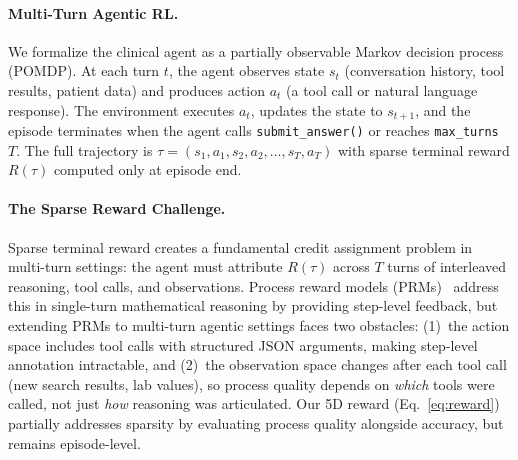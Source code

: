 \documentclass{article}
\begin{document}
\paragraph{Multi-Turn Agentic RL.}
We formalize the clinical agent as a partially observable Markov decision process (POMDP). At each turn $t$, the agent observes state $s_t$ (conversation history, tool results, patient data) and produces action $a_t$ (a tool call or natural language response). The environment executes $a_t$, updates the state to $s_{t+1}$, and the episode terminates when the agent calls \texttt{submit\_answer()} or reaches \texttt{max\_turns}~$T$. The full trajectory is $\tau = (s_1, a_1, s_2, a_2, \ldots, s_T, a_T)$ with sparse terminal reward $R(\tau)$ computed only at episode end.

\paragraph{The Sparse Reward Challenge.}
Sparse terminal reward creates a fundamental credit assignment problem in multi-turn settings: the agent must attribute $R(\tau)$ across $T$ turns of interleaved reasoning, tool calls, and observations. Process reward models (PRMs)~\citep{lightman2024lets, uesato2022solving} address this in single-turn mathematical reasoning by providing step-level feedback, but extending PRMs to multi-turn agentic settings faces two obstacles: (1)~the action space includes tool calls with structured JSON arguments, making step-level annotation intractable, and (2)~the observation space changes after each tool call (new search results, lab values), so process quality depends on \emph{which} tools were called, not just \emph{how} reasoning was articulated. Our 5D reward (Eq.~\ref{eq:reward}) partially addresses sparsity by evaluating process quality alongside accuracy, but remains episode-level.
\end{document}
